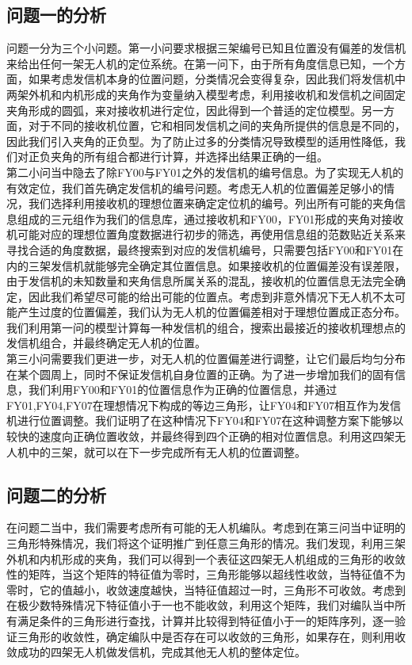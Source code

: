\documentclass{my_paper}
\begin{document}
\subsection{问题一的分析}
问题一分为三个小问题。第一小问要求根据三架编号已知且位置没有偏差的发信机来给出任何一架无人机的定位系统。在第一问下，由于所有角度信息已知，一个方面，如果考虑发信机本身的位置问题，分类情况会变得复杂，因此我们将发信机中两架外机和内机形成的夹角作为变量纳入模型考虑，利用接收机和发信机之间固定夹角形成的圆弧，来对接收机进行定位，因此得到一个普适的定位模型。另一方面，对于不同的接收机位置，它和相同发信机之间的夹角所提供的信息是不同的，因此我们引入夹角的正负型。为了防止过多的分类情况导致模型的适用性降低，我们对正负夹角的所有组合都进行计算，并选择出结果正确的一组。\\

第二小问当中隐去了除FY00与FY01之外的发信机的编号信息。为了实现无人机的有效定位，我们首先确定发信机的编号问题。考虑无人机的位置偏差足够小的情况，我们选择利用接收机的理想位置来确定定位机的编号。列出所有可能的夹角信息组成的三元组作为我们的信息库，通过接收机和FY00，FY01形成的夹角对接收机可能对应的理想位置角度数据进行初步的筛选，再使用信息组的范数贴近关系来寻找合适的角度数据，最终搜索到对应的发信机编号，只需要包括FY00和FY01在内的三架发信机就能够完全确定其位置信息。如果接收机的位置偏差没有误差限，由于发信机的未知数量和夹角信息所属关系的混乱，接收机的位置信息无法完全确定，因此我们希望尽可能的给出可能的位置点。考虑到非意外情况下无人机不太可能产生过度的位置偏差，我们认为无人机的位置偏差相对于理想位置成正态分布。我们利用第一问的模型计算每一种发信机的组合，搜索出最接近的接收机理想点的发信机组合，并最终确定无人机的位置。\\

第三小问需要我们更进一步，对无人机的位置偏差进行调整，让它们最后均匀分布在某个圆周上，同时不保证发信机自身位置的正确。为了进一步增加我们的固有信息，我们利用FY00和FY01的位置信息作为正确的位置信息，并通过FY01,FY04,FY07在理想情况下构成的等边三角形，让FY04和FY07相互作为发信机进行位置调整。我们证明了在这种情况下FY04和FY07在这种调整方案下能够以较快的速度向正确位置收敛，并最终得到四个正确的相对位置信息。利用这四架无人机中的三架，就可以在下一步完成所有无人机的位置调整。\cite{liu2017novel}
\subsection{问题二的分析}
在问题二当中，我们需要考虑所有可能的无人机编队。考虑到在第三问当中证明的三角形特殊情况，我们将这个证明推广到任意三角形的情况。我们发现，利用三架外机和内机形成的夹角，我们可以得到一个表征这四架无人机组成的三角形的收敛性的矩阵，当这个矩阵的特征值为零时，三角形能够以超线性收敛，当特征值不为零时，它的值越小，收敛速度越快，当特征值超过一时，三角形不可收敛。考虑到在极少数特殊情况下特征值小于一也不能收敛，利用这个矩阵，我们对编队当中所有满足条件的三角形进行查找，计算并比较得到特征值小于一的矩阵序列，逐一验证三角形的收敛性，确定编队中是否存在可以收敛的三角形，如果存在，则利用收敛成功的四架无人机做发信机，完成其他无人机的整体定位。
\end{document}

